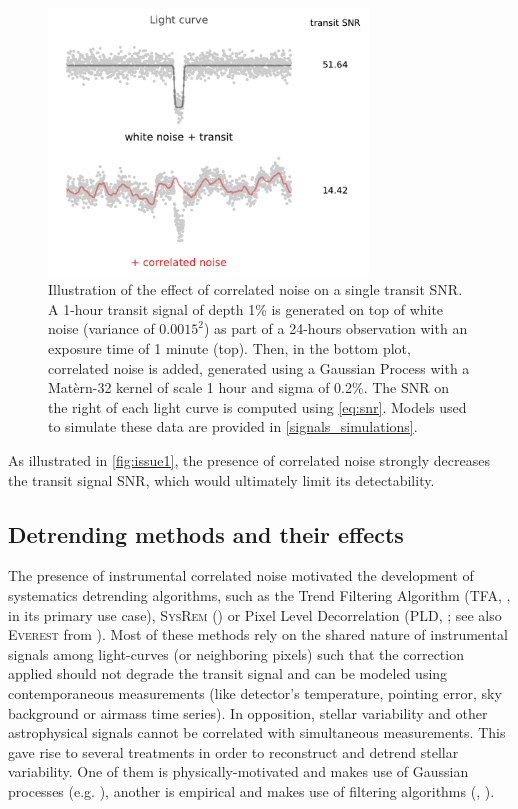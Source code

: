 \documentclass{aastex631}
\begin{document}
\begin{figure}[H]
    \begin{centering}
        \includegraphics[width=8.5cm]{issue1.pdf}
        \caption{Illustration of the effect of correlated noise on a single transit SNR. A 1-hour transit signal of depth 1\% is generated on top of white noise (variance of $0.0015^2$) as part of a 24-hours observation with an exposure time of 1 minute (top). Then, in the bottom plot, correlated noise is added, generated using a Gaussian Process with a Matèrn-32 kernel of scale 1 hour and sigma of 0.2\%. The SNR on the right of each light curve is computed using \autoref{eq:snr}. Models used to simulate these data are provided in \autoref{signals_simulations}.}
        \label{fig:issue1}
    \end{centering}
\end{figure}

As illustrated in \autoref{fig:issue1}, the presence of correlated noise strongly decreases the transit signal SNR, which would ultimately limit its detectability. 

\subsection{Detrending methods and their effects}\label{detrending_effect}
The presence of instrumental correlated noise motivated the development of systematics detrending algorithms, such as the Trend Filtering Algorithm (\textsc{TFA}, \citealt{tfa}, in its primary use case), \textsc{SysRem} (\citealt{sysrem}) or Pixel Level Decorrelation (\textsc{PLD}, \citealt{pld}; see also \textsc{Everest} from \citealt{everest1, everest2}). Most of these methods rely on the shared nature of instrumental signals among light-curves (or neighboring pixels) such that the correction applied should not degrade the transit signal and can be modeled using contemporaneous measurements (like detector's temperature, pointing error, sky background or airmass time series). In opposition, stellar variability and other astrophysical signals cannot be correlated with simultaneous measurements. This gave rise to several treatments in order to reconstruct and detrend stellar variability. One of them is physically-motivated and makes use of Gaussian processes (e.g. \citealt{k2sc}), another is empirical and makes use of filtering algorithms (\citealt{Jenkins2010}, \citealt{wotan}).\\\\
\end{document}
